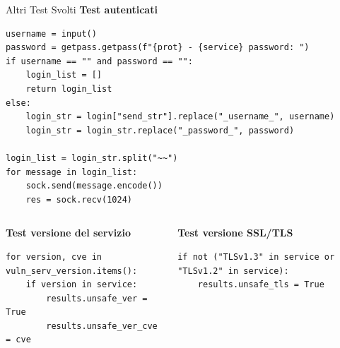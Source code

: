 \begin{frame}[fragile]{Altri Test Svolti}
\textbf{Test autenticati}
\begin{lstlisting}[style=statalepython, basicstyle=\tiny]
username = input()
password = getpass.getpass(f"{prot} - {service} password: ")
if username == "" and password == "":
    login_list = []
    return login_list
else:
    login_str = login["send_str"].replace("_username_", username)
    login_str = login_str.replace("_password_", password)

login_list = login_str.split("~~")
for message in login_list:
    sock.send(message.encode())
    res = sock.recv(1024)
\end{lstlisting}
\begin{columns}
\begin{column}{0.5\textwidth}
\textbf{Test versione del servizio}
\begin{lstlisting}[style=statalepython, basicstyle=\tiny]
for version, cve in vuln_serv_version.items():
    if version in service:
        results.unsafe_ver = True
        results.unsafe_ver_cve = cve
\end{lstlisting}
\end{column}
\begin{column}{0.5\textwidth}
\textbf{Test versione SSL/TLS}
\begin{lstlisting}[style=statalepython, basicstyle=\tiny]
if not ("TLSv1.3" in service or "TLSv1.2" in service):
    results.unsafe_tls = True
\end{lstlisting}
\end{column}
\end{columns}

\end{frame}